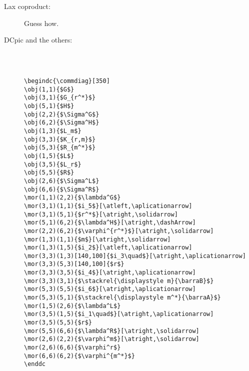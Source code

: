 \documentclass{europroc}
\begin{document}
\begin{description}
\item[Lax coproduct:] Guess how.

\item[DCpic and the others:] {\ }

{\footnotesize
\begin{verbatim}

\begindc{\commdiag}[350]
\obj(1,1){$G$}
\obj(3,1){$G_{r^*}$}
\obj(5,1){$H$}
\obj(2,2){$\Sigma^G$}
\obj(6,2){$\Sigma^H$}
\obj(1,3){$L_m$}
\obj(3,3){$K_{r,m}$}
\obj(5,3){$R_{m^*}$}
\obj(1,5){$L$}
\obj(3,5){$L_r$}
\obj(5,5){$R$}
\obj(2,6){$\Sigma^L$}
\obj(6,6){$\Sigma^R$}
\mor(1,1)(2,2){$\lambda^G$}
\mor(3,1)(1,1){$i_5$}[\atleft,\aplicationarrow]
\mor(3,1)(5,1){$r^*$}[\atright,\solidarrow]
\mor(5,1)(6,2){$\lambda^H$}[\atright,\dashArrow]
\mor(2,2)(6,2){$\varphi^{r^*}$}[\atright,\solidarrow]
\mor(1,3)(1,1){$m$}[\atright,\solidarrow]
\mor(1,3)(1,5){$i_2$}[\atleft,\aplicationarrow]
\mor(3,3)(1,3)[140,100]{$i_3\quad$}[\atright,\aplicationarrow]
\mor(3,3)(5,3)[140,100]{$r$}
\mor(3,3)(3,5){$i_4$}[\atright,\aplicationarrow]
\mor(3,3)(3,1){$\stackrel{\displaystyle m}{\barraB}$}
\mor(5,3)(5,5){$i_6$}[\atright,\aplicationarrow]
\mor(5,3)(5,1){$\stackrel{\displaystyle m^*}{\barraA}$}
\mor(1,5)(2,6){$\lambda^L$}
\mor(3,5)(1,5){$i_1\quad$}[\atright,\aplicationarrow]
\mor(3,5)(5,5){$r$}
\mor(5,5)(6,6){$\lambda^R$}[\atright,\solidarrow]
\mor(2,6)(2,2){$\varphi^m$}[\atright,\solidarrow]
\mor(2,6)(6,6){$\varphi^r$}
\mor(6,6)(6,2){$\varphi^{m^*}$}
\enddc
\end{verbatim}
}

\end{description}
\end{document}
